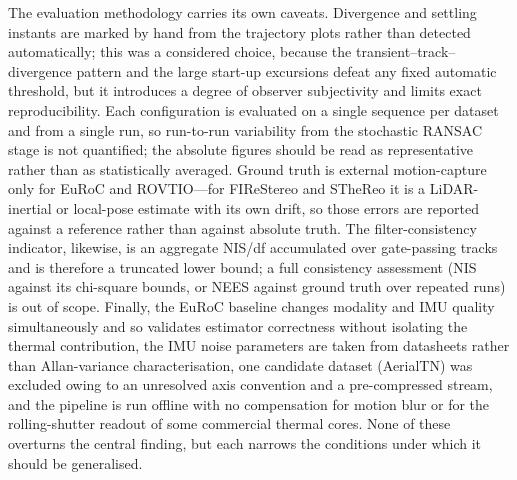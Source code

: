 The evaluation methodology carries its own caveats. Divergence and settling instants are marked by hand from the trajectory plots rather than detected automatically; this was a considered choice, because the transient--track--divergence pattern and the large start-up excursions defeat any fixed automatic threshold, but it introduces a degree of observer subjectivity and limits exact reproducibility. Each configuration is evaluated on a single sequence per dataset and from a single run, so run-to-run variability from the stochastic RANSAC stage is not quantified; the absolute figures should be read as representative rather than as statistically averaged. Ground truth is external motion-capture only for EuRoC and ROVTIO---for FIReStereo and STheReo it is a LiDAR-inertial or local-pose estimate with its own drift, so those errors are reported against a reference rather than against absolute truth. The filter-consistency indicator, likewise, is an aggregate NIS/df accumulated over gate-passing tracks and is therefore a truncated lower bound; a full consistency assessment (NIS against its chi-square bounds, or NEES against ground truth over repeated runs) is out of scope. Finally, the EuRoC baseline changes modality and IMU quality simultaneously and so validates estimator correctness without isolating the thermal contribution, the IMU noise parameters are taken from datasheets rather than Allan-variance characterisation, one candidate dataset (AerialTN) was excluded owing to an unresolved axis convention and a pre-compressed stream, and the pipeline is run offline with no compensation for motion blur or for the rolling-shutter readout of some commercial thermal cores. None of these overturns the central finding, but each narrows the conditions under which it should be generalised.